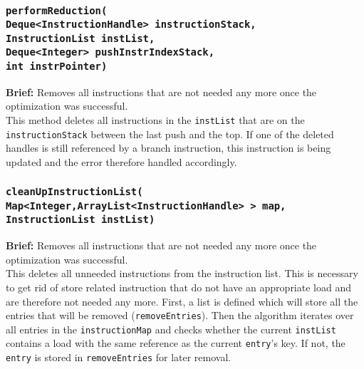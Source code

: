 %

\subsubsection{\texttt{performReduction(\\
\hspace{2cm}Deque<InstructionHandle> instructionStack, \\
\hspace{2cm}InstructionList instList, \\
\hspace{2cm}Deque<Integer> pushInstrIndexStack, \\
\hspace{2cm}int instrPointer)}}

\textbf{Brief: }Removes all instructions that are not needed any more once the optimization was successful. \\

This method deletes all instructions in the \texttt{instList} that are on the \texttt{instructionStack} between the last push and the top. If one of the deleted handles is still referenced by a branch instruction, this instruction is being updated and the error therefore handled accordingly. 

\subsubsection{\texttt{cleanUpInstructionList(\\
\hspace{2cm}Map<Integer,ArrayList<InstructionHandle> > map,\\
\hspace{2cm}InstructionList instList)}}

\textbf{Brief: }Removes all instructions that are not needed any more once the optimization was successful. \\

This deletes all unneeded instructions from the instruction list. This is necessary to get rid of store related instruction that do not have an appropriate load and are therefore not needed any more. 
First, a list is defined which will store all the entries that will be removed (\texttt{removeEntries}). Then the algorithm iterates over all entries in the \texttt{instructionMap} and checks whether the current \texttt{instList} contains a load with the same reference as the current \texttt{entry}’s key. If not, the \texttt{entry} is stored in \texttt{removeEntries} for later removal.